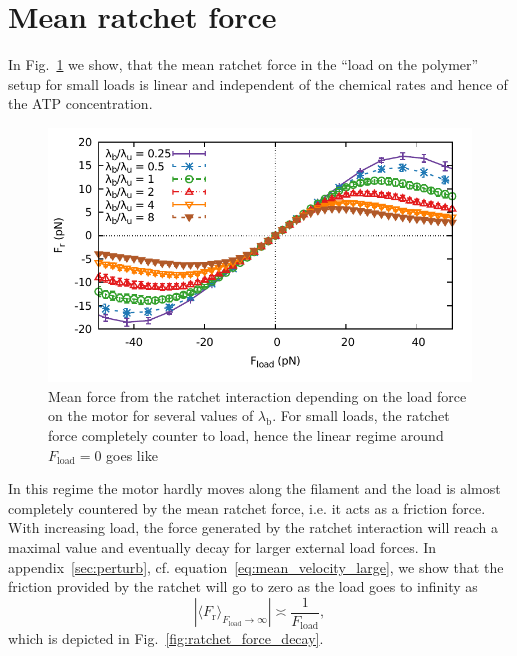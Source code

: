 \documentclass[aps,pre,twocolumn,showpacs,showkeys,superscriptaddress,floatfix]{revtex4-1}
\begin{document}
\section{Mean ratchet force}
\label{sec:mean_ratchet_force}
In Fig.~\ref{fig:ratchet_force} we show, 
that the mean ratchet force in the ``load on the polymer'' setup for small loads is linear and independent of the chemical rates and hence of the ATP concentration. 
\begin{figure}[t]
\centering
\includegraphics[width=0.9\linewidth,height=!]{ratchet_force}
\caption{
\label{fig:ratchet_force}
Mean force from the ratchet interaction depending on the load force on the motor for several values of $\lambda_\text{b}$. 
For small loads, the ratchet force completely counter to load, hence the linear regime around $F_\text{load}=0$ goes like
}
\end{figure}
In this regime the motor hardly moves along the filament and the load is almost completely countered by the mean ratchet force, i.e. it acts as a friction force.
With increasing load, the force generated by the ratchet interaction will reach a maximal value and eventually decay for larger external load forces. 
In appendix~\ref{sec:perturb}, cf. equation~\eqref{eq:mean_velocity_large}, we show that the friction provided by the ratchet will go to zero as the load goes to infinity as 
\begin{equation}
\left| \langle F_\text{r} \rangle_{F_\text{load}\rightarrow\infty} \right| \asymp \frac{1}{F_\text{load}} , 
\label{eq:ratchet_vs_load}
\end{equation}
which is depicted in Fig.~\ref{fig:ratchet_force_decay}. 
\end{document}
